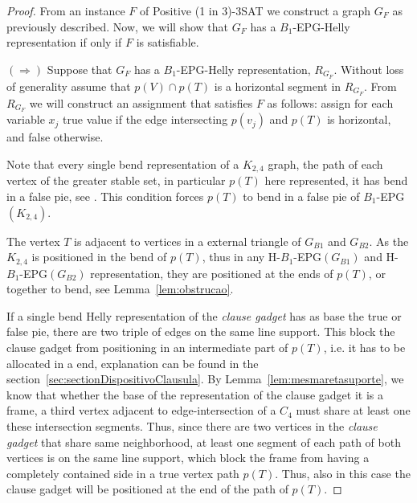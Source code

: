\documentclass[a4paper,11pt]{article}
\begin{document}
\begin{proof}
From an instance $F$ of {\sc Positive (1 in 3)-3SAT} we construct a graph $G_F$ as previously described. Now, we will show that $G_F$ has a   $B_{1}$-EPG-Helly representation if only if $F$ is satisfiable.

$(\Rightarrow)$ Suppose that $G_F$ has a $B_1$-EPG-Helly representation, $R_{G_F}$. Without loss of generality assume that $p(V) \cap p(T)$ is a horizontal segment in  $R_{G_F}$. From $R_{G_F}$ we will construct an assignment that satisfies $F$ as follows: assign for each variable $ x_{j}$ true value if the edge intersecting $p(v_j)$ and $p(T)$ is horizontal, and false otherwise.

Note that every single bend representation of a $K_{2,4}$ graph, the path of each vertex of the greater stable set, in particular $p(T)$ here represented, it has bend in a false pie, see \citep{Asinowski2009}. This condition forces $p(T)$ to bend in a false pie of $B_1$-EPG$(K_{2,4})$. 

The vertex $T$ is adjacent to vertices in a external triangle of $G_{B1}$ and $G_{B2}$. As the $K_{2,4}$ is positioned in the bend of $p(T)$, thus in any H-$B_{1}$-EPG$(G_{B1})$  and  H-$B_{1}$-EPG$(G_{B2})$ representation, they are positioned at the ends of $p(T)$, or together to bend, see Lemma~\ref{lem:obstrucao}.   

If a single bend Helly representation of the \textit{clause gadget} has as base the true or false pie, there are two triple of edges on the same line support. This block the clause gadget from positioning in an intermediate part of  $p(T)$, i.e. it has to be allocated in a end, explanation can be found in the section~\ref{sec:sectionDispositivoClausula}. By Lemma~\ref{lem:mesmaretasuporte}, we know that whether the base of the representation of the clause gadget it is a frame, a third vertex  adjacent to edge-intersection of a $C_4$ must share at least one these intersection segments. Thus, since there are two vertices in the \textit{clause gadget}  that share same neighborhood, at least one segment of each path of both vertices is on the same line support, which block the frame from having a completely contained side in a true vertex path $p(T)$. Thus, also in this case the clause gadget will be positioned at the end of the path of $p(T)$.


\end{proof}
\end{document}
